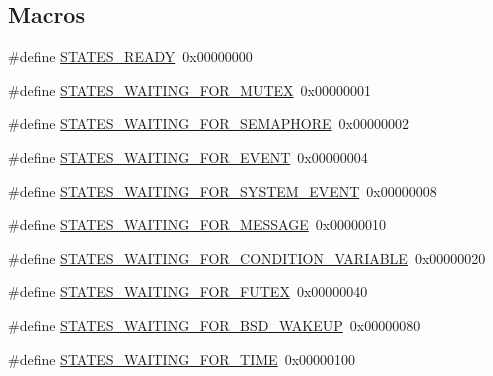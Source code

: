 \subsection*{Macros}
\begin{DoxyCompactItemize}
\item 
\#define \mbox{\hyperlink{group__RTEMSScoreStates_gaa2a0eb3ea4004e24c0f926e55e9e3d5c}{S\+T\+A\+T\+E\+S\+\_\+\+R\+E\+A\+DY}}~0x00000000
\item 
\#define \mbox{\hyperlink{group__RTEMSScoreStates_gac728552c70b0e8b76c7f97e537346b6e}{S\+T\+A\+T\+E\+S\+\_\+\+W\+A\+I\+T\+I\+N\+G\+\_\+\+F\+O\+R\+\_\+\+M\+U\+T\+EX}}~0x00000001
\item 
\#define \mbox{\hyperlink{group__RTEMSScoreStates_ga7fa41b4eaddd04b5209c5f462faee66f}{S\+T\+A\+T\+E\+S\+\_\+\+W\+A\+I\+T\+I\+N\+G\+\_\+\+F\+O\+R\+\_\+\+S\+E\+M\+A\+P\+H\+O\+RE}}~0x00000002
\item 
\#define \mbox{\hyperlink{group__RTEMSScoreStates_gad3d889ccedf239cf820340bd42858b7f}{S\+T\+A\+T\+E\+S\+\_\+\+W\+A\+I\+T\+I\+N\+G\+\_\+\+F\+O\+R\+\_\+\+E\+V\+E\+NT}}~0x00000004
\item 
\#define \mbox{\hyperlink{group__RTEMSScoreStates_ga4cd356db218ca0f93cea8bed214c5532}{S\+T\+A\+T\+E\+S\+\_\+\+W\+A\+I\+T\+I\+N\+G\+\_\+\+F\+O\+R\+\_\+\+S\+Y\+S\+T\+E\+M\+\_\+\+E\+V\+E\+NT}}~0x00000008
\item 
\#define \mbox{\hyperlink{group__RTEMSScoreStates_gafe2ec76a2db20ffcb0a083f640e5943f}{S\+T\+A\+T\+E\+S\+\_\+\+W\+A\+I\+T\+I\+N\+G\+\_\+\+F\+O\+R\+\_\+\+M\+E\+S\+S\+A\+GE}}~0x00000010
\item 
\#define \mbox{\hyperlink{group__RTEMSScoreStates_gacd2c537362ddcf9d9b96daf9790d7a4f}{S\+T\+A\+T\+E\+S\+\_\+\+W\+A\+I\+T\+I\+N\+G\+\_\+\+F\+O\+R\+\_\+\+C\+O\+N\+D\+I\+T\+I\+O\+N\+\_\+\+V\+A\+R\+I\+A\+B\+LE}}~0x00000020
\item 
\#define \mbox{\hyperlink{group__RTEMSScoreStates_ga6e03053dd51e47e46e8df73e18b07715}{S\+T\+A\+T\+E\+S\+\_\+\+W\+A\+I\+T\+I\+N\+G\+\_\+\+F\+O\+R\+\_\+\+F\+U\+T\+EX}}~0x00000040
\item 
\#define \mbox{\hyperlink{group__RTEMSScoreStates_gaf0559b2731ec4d3215226b01d95b9b08}{S\+T\+A\+T\+E\+S\+\_\+\+W\+A\+I\+T\+I\+N\+G\+\_\+\+F\+O\+R\+\_\+\+B\+S\+D\+\_\+\+W\+A\+K\+E\+UP}}~0x00000080
\item 
\mbox{\label{group__RTEMSScoreStates_ga64dacc14a1e9743f2a60e68b8973e5b9}} 
\#define \mbox{\hyperlink{group__RTEMSScoreStates_ga64dacc14a1e9743f2a60e68b8973e5b9}{S\+T\+A\+T\+E\+S\+\_\+\+W\+A\+I\+T\+I\+N\+G\+\_\+\+F\+O\+R\+\_\+\+T\+I\+ME}}~0x00000100

\end{DoxyCompactItemize}
